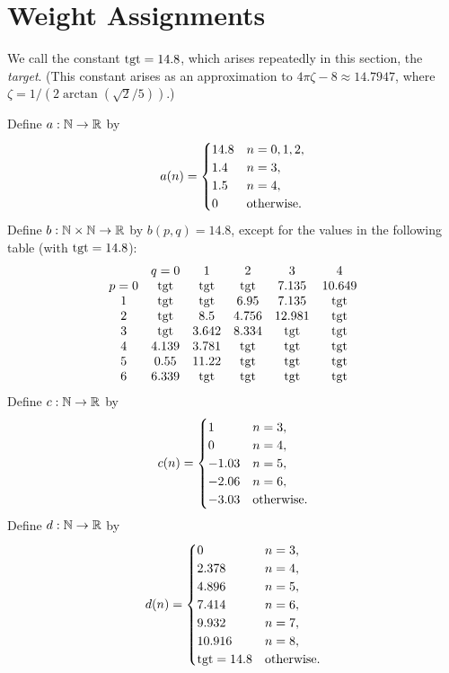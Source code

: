 \section{Weight Assignments}\label{sec:wtassign}

We call the constant ${\operatorname{tgt}}=14.8$, which arises repeatedly in
this section, the {\it target}.  (This constant arises as an
approximation to $4\pi\zeta -8\approx 14.7947$, where $\zeta =
1/(2\arctan(\sqrt{2}/5))$.)
%

  Define $a:{\mathbb N}\to {\mathbb R}$ by
  $$a(n) = \begin{cases}
    14.8 &n=0,1,2,\\
    1.4 & n=3,\\
    1.5 & n=4,\\
    0 & \text{otherwise.}
  \end{cases}
  \index{aZ@$a(n)$}
  $$
  Define $b:{\mathbb N}\times {\mathbb N}\to {\mathbb R}$ by $b(p,q)=14.8$,
  except for the values in the following table
  (with  ${\operatorname{tgt}}=14.8$):
  {
  \def\tx{\op{tgt}}
  $$\begin{matrix}  &q=0&1&2&3&4\\
           p=0&\tx&\tx&\tx&7.135&10.649\\
           1&\tx&\tx&6.95&7.135&\tx\\
           2&\tx&8.5&4.756&12.981&\tx\\
           3&\tx&3.642&8.334&\tx&\tx\\
           4&4.139&3.781&\tx&\tx&\tx\\
           5&0.55&11.22&\tx&\tx&\tx\\
           6&6.339&\tx&\tx&\tx&\tx
   \end{matrix}
   \index{bZ@$b(p,q)$}
   $$
   }
  Define $c:{\mathbb N}\to {\mathbb R}$ by
  $$c(n) = \begin{cases}
    1 & n=3,\\
    0 & n=4,\\
    -1.03 &n=5,\\
    -2.06 &n=6,\\
    -3.03 &\text{otherwise.}
    \end{cases}
    \index{cZ@$c(n)$}
    $$
    Define $d:{\mathbb N}\to {\mathbb R}$ by
  $$d(n) = \begin{cases}
    0 & n=3, \\
    2.378 & n=4, \\
    4.896 & n=5, \\
    7.414 & n=6, \\
    9.932 & n=7, \\
    10.916 & n=8,\\
    \op{tgt}=14.8 & \text{otherwise}.
  \end{cases}
  \index{dZ@$d(n)$}
  $$


